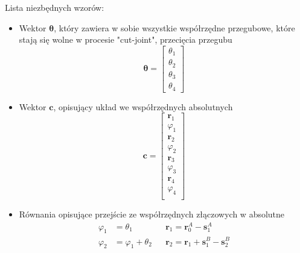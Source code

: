 Lista niezbędnych wzorów:
\begin{itemize}
    \item Wektor $\boldsymbol{\theta}$, który zawiera w sobie wszystkie współrzędne przegubowe, które stają się wolne w procesie "cut-joint", przecięcia przegubu
        \begin{equation}
            \label{eq:vector_theta}
            \boldsymbol{\theta} = \begin{bmatrix}
                                    \theta_1\\
                                    \theta_2\\
                                    \theta_3\\
                                    \theta_4
                                  \end{bmatrix}
        \end{equation}
    \item Wektor $\boldsymbol{c}$, opisujący układ we współrzędnych absolutnych
        \begin{equation}
            \label{eq:vector_c}
            \boldsymbol{c} =\begin{bmatrix}
                              \boldsymbol{r}_1\\
                              \varphi_1\\
                              \boldsymbol{r}_2\\
                              \varphi_2\\
                              \boldsymbol{r}_3\\
                              \varphi_3\\
                              \boldsymbol{r}_4\\
                              \varphi_4\\
                            \end{bmatrix}
        \end{equation}
    \item Równania opisujące przejście ze współrzędnych złączowych w absolutne
        \begin{equation}
            \label{eq:transfer_equations}
            \begin{aligned}
            \varphi_1 &=\theta_1 && \boldsymbol{r}_1 = \boldsymbol{r}_0^A-\boldsymbol{s}_1^A\\
            \varphi_2 &= \varphi_1+\theta_2 && \boldsymbol{r}_2 = \boldsymbol{r}_1+\boldsymbol{s}_1^B-\boldsymbol{s}_2^B\\

\end{aligned}
\end{equation}
\end{itemize}

